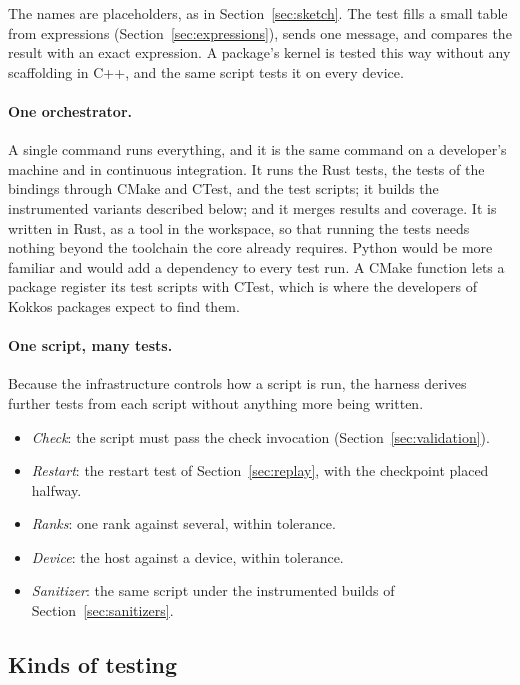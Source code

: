 \documentclass[11pt,a4paper]{article}
\begin{document}
The names are placeholders, as in Section~\ref{sec:sketch}.  The test fills
a small table from expressions (Section~\ref{sec:expressions}), sends one
message, and compares the result with an exact expression.  A package's
kernel is tested this way without any scaffolding in C++, and the same
script tests it on every device.

\paragraph{One orchestrator.}  A single command runs everything, and it is
the same command on a developer's machine and in continuous integration.
It runs the Rust tests, the tests of the bindings through CMake and CTest,
and the test scripts; it builds the instrumented variants described below;
and it merges results and coverage.  It is written in Rust, as a tool in the
workspace, so that running the tests needs nothing beyond the toolchain the
core already requires.  Python would be more familiar and would add a
dependency to every test run.  A CMake function lets a package register its
test scripts with CTest, which is where the developers of Kokkos packages
expect to find them.

\paragraph{One script, many tests.}  Because the infrastructure controls how
a script is run, the harness derives further tests from each script without
anything more being written.

\begin{itemize}
  \item \emph{Check}: the script must pass the check invocation
        (Section~\ref{sec:validation}).
  \item \emph{Restart}: the restart test of Section~\ref{sec:replay}, with
        the checkpoint placed halfway.
  \item \emph{Ranks}: one rank against several, within tolerance.
  \item \emph{Device}: the host against a device, within tolerance.
  \item \emph{Sanitizer}: the same script under the instrumented builds of
        Section~\ref{sec:sanitizers}.
\end{itemize}

\subsection{Kinds of testing}
\end{document}
